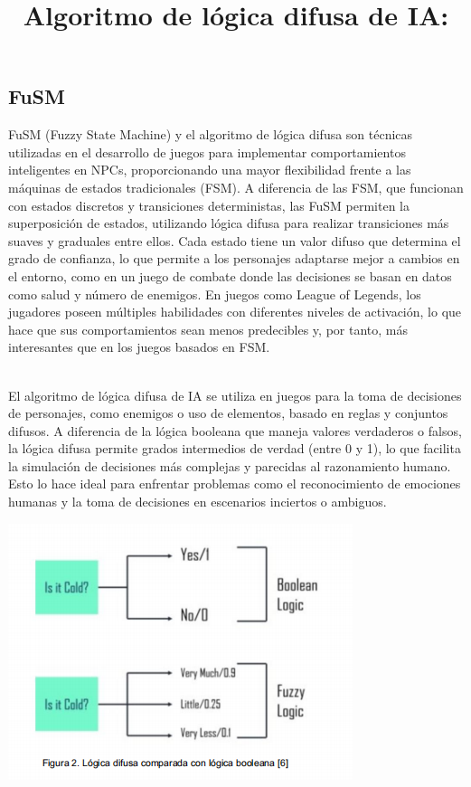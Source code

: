 \documentclass{article}
\begin{document}
\subsection{FuSM} 
FuSM (Fuzzy State Machine) y el algoritmo de lógica difusa son técnicas utilizadas en el desarrollo de juegos para implementar comportamientos inteligentes en NPCs, proporcionando una mayor flexibilidad frente a las máquinas de estados tradicionales (FSM). A diferencia de las FSM, que funcionan con estados discretos y transiciones deterministas, las FuSM permiten la superposición de estados, utilizando lógica difusa para realizar transiciones más suaves y graduales entre ellos. Cada estado tiene un valor difuso que determina el grado de confianza, lo que permite a los personajes adaptarse mejor a cambios en el entorno, como en un juego de combate donde las decisiones se basan en datos como salud y número de enemigos. En juegos como League of Legends, los jugadores poseen múltiples habilidades con diferentes niveles de activación, lo que hace que sus comportamientos sean menos predecibles y, por tanto, más interesantes que en los juegos basados en FSM.
\\
\\
\title{\textbf{Algoritmo de lógica difusa de IA:}}
El algoritmo de lógica difusa de IA se utiliza en juegos para la toma de decisiones de personajes, como enemigos o uso de elementos, basado en reglas y conjuntos difusos. A diferencia de la lógica booleana que maneja valores verdaderos o falsos, la lógica difusa permite grados intermedios de verdad (entre 0 y 1), lo que facilita la simulación de decisiones más complejas y parecidas al razonamiento humano. Esto lo hace ideal para enfrentar problemas como el reconocimiento de emociones humanas y la toma de decisiones en escenarios inciertos o ambiguos.

\includegraphics{Logica boolena.png}
\\
\end{document}

